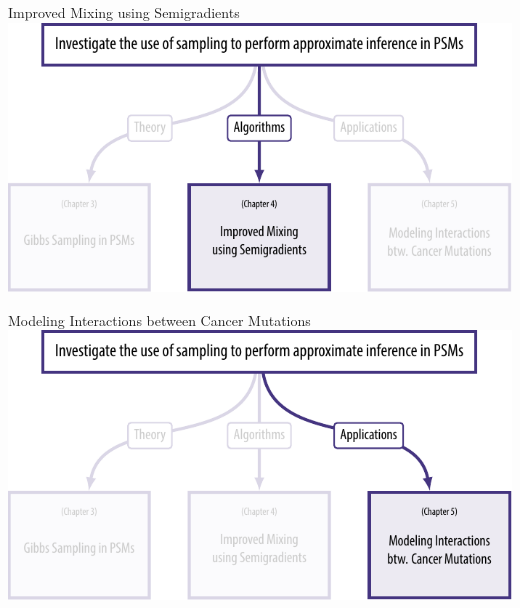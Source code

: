 \documentclass[mathserif]{beamer}
\begin{document}
\begin{frame}{Improved Mixing using Semigradients}
\centering
\includegraphics[width=\textwidth]{figures/chapters2.pdf}
\end{frame}

\begin{frame}{Modeling Interactions between Cancer Mutations}
\centering
\includegraphics[width=\textwidth]{figures/chapters3.pdf}
\end{frame}
\end{document}
